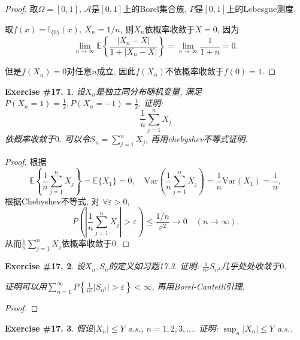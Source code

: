 \documentclass[UTF8, a4paper]{article}
\newtheorem{exercise}{Exercise \#17.}
\begin{document}
\begin{proof}
    取\(\Omega = [0, 1]\), \(\mathcal{A}\)是\([0, 1]\)上的Borel集合族, \({P}\)是\([0, 1]\)上的Lebesgue测度.

取\(f(x) = \mathbb{I}_{\{0\}}(x)\), \(X_n = 1/n\), 则\(X_n\)依概率收敛于\(X = 0\), 因为
$$
\lim _{n \rightarrow \infty} \mathbb{E}\left\{\frac{\left|X_n-X\right|}{1+\left|X_n-X\right|}\right\}= \lim_{n\to\infty} \frac{1}{1+n} = 0 .
$$

但是\(f(X_n) = 0\)对任意\(n\)成立, 因此\(f(X_n)\)不依概率收敛于\(f(0) = 1\).
\end{proof}



\begin{framed}
\begin{exercise}
设\(X_n\)是独立同分布随机变量, 满足\(P(X_n = 1) = \frac{1}{2}, P(X_n = -1) = \frac{1}{2}\).
证明:
$$
\frac{1}{n} \sum_{j=1}^n X_j
$$
依概率收敛于\(0\).
可以令\(S_n = \sum_{j=1}^{n}X_j\), 再用chebyshev不等式证明.
\end{exercise}
\end{framed}

\begin{proof}
根据 
$$
\mathbb{E}\left\{\frac{1}{n}\sum_{j=1}^{n}X_j\right\} = \mathbb{E}\{X_1\} = 0, \quad \text{Var}\left(\frac{1}{n}\sum_{j=1}^{n}X_j\right) = \frac{1}{n}\text{Var}(X_1) = \frac{1}{n},
$$
根据Chebyshev不等式, 对
\(\forall \varepsilon > 0\), 
$$
P\left(\left|\frac{1}{n}\sum_{j=1}^{n}X_j\right| > \varepsilon\right) \leq \frac{1/n}{\varepsilon^2} \to 0 \quad (n\to \infty).
$$
从而\(\frac{1}{n}\sum_{j=1}^n X_j\)依概率收敛于\(0\).
\end{proof}



\begin{framed}
\begin{exercise}
设\(X_n, S_n\)的定义如习题17.3. 证明:
\(\frac{1}{n^2}S_{n^2}\)几乎处处收敛于\(0\).

证明可以用\(\sum_{n=1}^{\infty}P\left\{\frac{1}{n^2}|S_{n^2}| > \varepsilon\right\} < \infty\), 再用Borel-Cantelli引理.
\end{exercise}
\end{framed}

\begin{proof}

\end{proof}


\begin{exercise}
假设\(|X_n| \leq Y\) a.s., \(n = 1,2,3,...\).
证明: \(\sup_{n}|X_n| \leq Y\) a.s..
\end{exercise}
\end{document}
